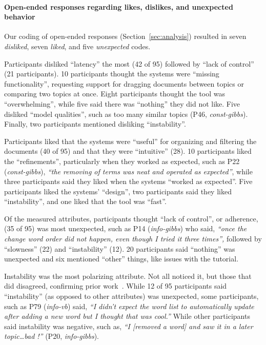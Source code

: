 \paragraph{Open-ended responses regarding likes, dislikes, and unexpected behavior}

Our coding of open-ended responses (Section~\ref{sec:analysis}) resulted in seven \textit{disliked}, seven \textit{liked}, and five \textit{unexpected} codes.

Participants disliked ``latency'' the most (42 of 95) followed by ``lack of control'' (21 participants).
10 participants thought the systems were ``missing functionality'', requesting support for dragging documents between topics or comparing two topics at once. Eight participants thought the tool was ``overwhelming'', while five said there was ``nothing'' they did not like. Five disliked ``model qualities'', such as too many similar topics (P46, \textit{const-gibbs}). Finally, two participants mentioned disliking ``instability''. 

Participants liked that the systems were ``useful'' for organizing and
filtering the documents (40 of 95) and that they were ``intuitive''
(28). 10 participants liked the ``refinements'', particularly when
they worked as expected, such as P22 (\textit{const-gibbs}),
\textit{``the removing of terms was neat and operated as expected''},
while three participants said they liked when the systems ``worked as
expected''. Five participants liked the systems' ``design'', two
participants said they liked ``instability'', and one liked that the
tool was ``fast''.

Of the measured attributes, participants thought ``lack of control'', or adherence, (35 of 95) was most unexpected, such as P14 (\textit{info-gibbs}) who said,\textit{ ``once the change word order did not happen, even though I tried it three times'',} followed by ``slowness'' (22) and ``instability'' (12).
20 participants said ``nothing'' was unexpected and six mentioned ``other'' things, like issues with the tutorial. 

Instability was the most
polarizing attribute.  Not all noticed it, but those that did disagreed, confirming
 prior work~\cite{Smith2018ClosingSystem}. While 12 of 95 participants said ``instability'' (as opposed to other attributes) was unexpected, some participants, such as P79 (\textit{info-vb}) said, \textit{``I didn't expect the word list to automatically update after adding a new word but I thought that was cool.''} While other participants said instability was negative, such as, \textit{``I [removed a word] and saw it in a later topic\dots bad !''} (P20, \textit{info-gibbs}). 
 
